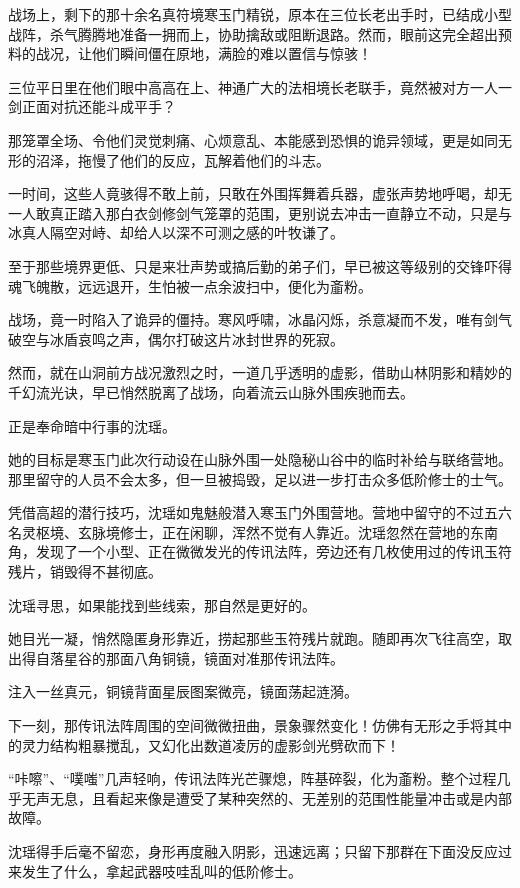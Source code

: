 战场上，剩下的那十余名真符境寒玉门精锐，原本在三位长老出手时，已结成小型战阵，杀气腾腾地准备一拥而上，协助擒敌或阻断退路。然而，眼前这完全超出预料的战况，让他们瞬间僵在原地，满脸的难以置信与惊骇！

三位平日里在他们眼中高高在上、神通广大的法相境长老联手，竟然被对方一人一剑正面对抗还能斗成平手？

那笼罩全场、令他们灵觉刺痛、心烦意乱、本能感到恐惧的诡异领域，更是如同无形的沼泽，拖慢了他们的反应，瓦解着他们的斗志。

一时间，这些人竟骇得不敢上前，只敢在外围挥舞着兵器，虚张声势地呼喝，却无一人敢真正踏入那白衣剑修剑气笼罩的范围，更别说去冲击一直静立不动，只是与冰真人隔空对峙、却给人以深不可测之感的叶牧谦了。

至于那些境界更低、只是来壮声势或搞后勤的弟子们，早已被这等级别的交锋吓得魂飞魄散，远远退开，生怕被一点余波扫中，便化为齑粉。

战场，竟一时陷入了诡异的僵持。寒风呼啸，冰晶闪烁，杀意凝而不发，唯有剑气破空与冰盾哀鸣之声，偶尔打破这片冰封世界的死寂。

\vspace{2em}

然而，就在山洞前方战况激烈之时，一道几乎透明的虚影，借助山林阴影和精妙的千幻流光诀，早已悄然脱离了战场，向着流云山脉外围疾驰而去。

正是奉命暗中行事的沈瑶。

她的目标是寒玉门此次行动设在山脉外围一处隐秘山谷中的临时补给与联络营地。那里留守的人员不会太多，但一旦被捣毁，足以进一步打击众多低阶修士的士气。

凭借高超的潜行技巧，沈瑶如鬼魅般潜入寒玉门外围营地。营地中留守的不过五六名灵枢境、玄脉境修士，正在闲聊，浑然不觉有人靠近。沈瑶忽然在营地的东南角，发现了一个小型、正在微微发光的传讯法阵，旁边还有几枚使用过的传讯玉符残片，销毁得不甚彻底。

沈瑶寻思，如果能找到些线索，那自然是更好的。

她目光一凝，悄然隐匿身形靠近，捞起那些玉符残片就跑。随即再次飞往高空，取出得自落星谷的那面八角铜镜，镜面对准那传讯法阵。

注入一丝真元，铜镜背面星辰图案微亮，镜面荡起涟漪。

下一刻，那传讯法阵周围的空间微微扭曲，景象骤然变化！仿佛有无形之手将其中的灵力结构粗暴搅乱，又幻化出数道凌厉的虚影剑光劈砍而下！

“咔嚓”、“噗嗤”几声轻响，传讯法阵光芒骤熄，阵基碎裂，化为齑粉。整个过程几乎无声无息，且看起来像是遭受了某种突然的、无差别的范围性能量冲击或是内部故障。

沈瑶得手后毫不留恋，身形再度融入阴影，迅速远离；只留下那群在下面没反应过来发生了什么，拿起武器吱哇乱叫的低阶修士。

